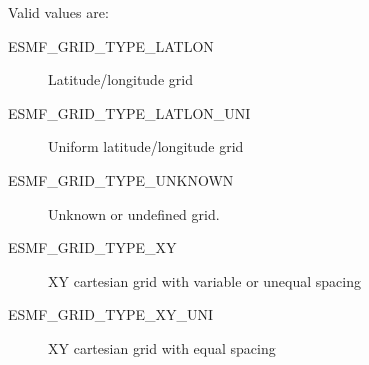  Valid values are:
 \begin{description}
    \item [ESMF\_GRID\_TYPE\_LATLON]
          Latitude/longitude grid
 
    \item [ESMF\_GRID\_TYPE\_LATLON\_UNI]
          Uniform latitude/longitude grid
 
    \item [ESMF\_GRID\_TYPE\_UNKNOWN]
          Unknown or undefined grid.

    \item [ESMF\_GRID\_TYPE\_XY]
          XY cartesian grid with variable or unequal spacing
 
    \item [ESMF\_GRID\_TYPE\_XY\_UNI]
          XY cartesian grid with equal spacing
 
 \end{description}


